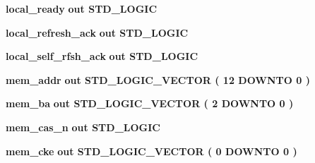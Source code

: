 \begin{DoxyCompactItemize}
\item 
{\bf local\+\_\+ready}  {\bfseries {\bfseries \textcolor{keywordflow}{out}\textcolor{vhdlchar}{ }}} {\bfseries \textcolor{comment}{S\+T\+D\+\_\+\+L\+O\+G\+IC}\textcolor{vhdlchar}{ }} 
\item 
{\bf local\+\_\+refresh\+\_\+ack}  {\bfseries {\bfseries \textcolor{keywordflow}{out}\textcolor{vhdlchar}{ }}} {\bfseries \textcolor{comment}{S\+T\+D\+\_\+\+L\+O\+G\+IC}\textcolor{vhdlchar}{ }} 
\item 
{\bf local\+\_\+self\+\_\+rfsh\+\_\+ack}  {\bfseries {\bfseries \textcolor{keywordflow}{out}\textcolor{vhdlchar}{ }}} {\bfseries \textcolor{comment}{S\+T\+D\+\_\+\+L\+O\+G\+IC}\textcolor{vhdlchar}{ }} 
\item 
{\bf mem\+\_\+addr}  {\bfseries {\bfseries \textcolor{keywordflow}{out}\textcolor{vhdlchar}{ }}} {\bfseries \textcolor{comment}{S\+T\+D\+\_\+\+L\+O\+G\+I\+C\+\_\+\+V\+E\+C\+T\+OR}\textcolor{vhdlchar}{ }\textcolor{vhdlchar}{(}\textcolor{vhdlchar}{ }\textcolor{vhdlchar}{ } \textcolor{vhdldigit}{12} \textcolor{vhdlchar}{ }\textcolor{keywordflow}{D\+O\+W\+N\+TO}\textcolor{vhdlchar}{ }\textcolor{vhdlchar}{ } \textcolor{vhdldigit}{0} \textcolor{vhdlchar}{ }\textcolor{vhdlchar}{)}\textcolor{vhdlchar}{ }} 
\item 
{\bf mem\+\_\+ba}  {\bfseries {\bfseries \textcolor{keywordflow}{out}\textcolor{vhdlchar}{ }}} {\bfseries \textcolor{comment}{S\+T\+D\+\_\+\+L\+O\+G\+I\+C\+\_\+\+V\+E\+C\+T\+OR}\textcolor{vhdlchar}{ }\textcolor{vhdlchar}{(}\textcolor{vhdlchar}{ }\textcolor{vhdlchar}{ } \textcolor{vhdldigit}{2} \textcolor{vhdlchar}{ }\textcolor{keywordflow}{D\+O\+W\+N\+TO}\textcolor{vhdlchar}{ }\textcolor{vhdlchar}{ } \textcolor{vhdldigit}{0} \textcolor{vhdlchar}{ }\textcolor{vhdlchar}{)}\textcolor{vhdlchar}{ }} 
\item 
{\bf mem\+\_\+cas\+\_\+n}  {\bfseries {\bfseries \textcolor{keywordflow}{out}\textcolor{vhdlchar}{ }}} {\bfseries \textcolor{comment}{S\+T\+D\+\_\+\+L\+O\+G\+IC}\textcolor{vhdlchar}{ }} 
\item 
{\bf mem\+\_\+cke}  {\bfseries {\bfseries \textcolor{keywordflow}{out}\textcolor{vhdlchar}{ }}} {\bfseries \textcolor{comment}{S\+T\+D\+\_\+\+L\+O\+G\+I\+C\+\_\+\+V\+E\+C\+T\+OR}\textcolor{vhdlchar}{ }\textcolor{vhdlchar}{(}\textcolor{vhdlchar}{ }\textcolor{vhdlchar}{ } \textcolor{vhdldigit}{0} \textcolor{vhdlchar}{ }\textcolor{keywordflow}{D\+O\+W\+N\+TO}\textcolor{vhdlchar}{ }\textcolor{vhdlchar}{ } \textcolor{vhdldigit}{0} \textcolor{vhdlchar}{ }\textcolor{vhdlchar}{)}\textcolor{vhdlchar}{ }} 

\end{DoxyCompactItemize}
